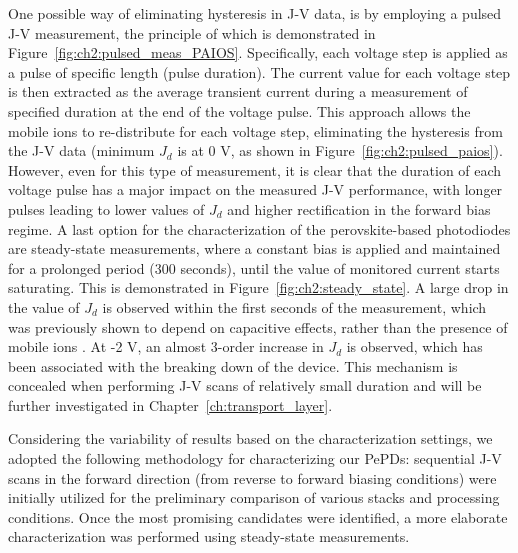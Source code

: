 One possible way of eliminating hysteresis in J-V data, is by employing a pulsed J-V measurement, the principle of which is demonstrated in Figure~\ref{fig:ch2:pulsed_meas_PAIOS}. Specifically, each voltage step is applied as a pulse of specific length (pulse duration). The current value for each voltage step is then extracted as the average transient current during a measurement of specified duration at the end of the voltage pulse. This approach allows the mobile ions to re-distribute for each voltage step, eliminating the hysteresis from the J-V data (minimum $J_d$ is at 0 V, as shown in Figure~\ref{fig:ch2:pulsed_paios}). However, even for this type of measurement, it is clear that the duration of each voltage pulse has a major impact on the measured J-V performance, with longer pulses leading to lower values of $J_d$ and higher rectification in the forward bias regime. A last option for the characterization of the perovskite-based photodiodes are steady-state measurements, where a constant bias is applied and maintained for a prolonged period (300 seconds), until the value of monitored current starts saturating. This is demonstrated in Figure~\ref{fig:ch2:steady_state}. A large drop in the value of $J_d$ is observed within the first seconds of the measurement, which was previously shown to depend on capacitive effects, rather than the presence of mobile ions \cite{Ollearo2021UltralowGeneration}. At -2 V, an almost 3-order increase in $J_d$ is observed, which has been associated with the breaking down of the device. This mechanism is concealed when performing J-V scans of relatively small duration and will be further investigated in Chapter~\ref{ch:transport_layer}. 

Considering the variability of results based on the characterization settings, we adopted the following methodology for characterizing our PePDs: sequential J-V scans in the forward direction (from reverse to forward biasing conditions) were initially utilized for the preliminary comparison of various stacks and processing conditions. Once the most promising candidates were identified, a more elaborate characterization was performed using steady-state measurements.  


